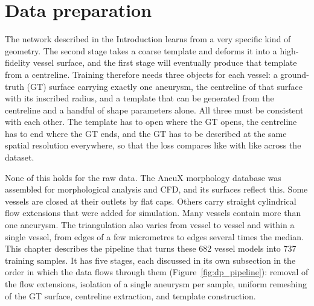 
\section{Data preparation}
\label{sec:dataprep}

The network described in the Introduction learns from a very specific kind of geometry. The second stage takes a coarse template and deforms it into a high-fidelity vessel surface, and the first stage will eventually produce that template from a centreline. Training therefore needs three objects for each vessel: a ground-truth (GT) surface carrying exactly one aneurysm, the centreline of that surface with its inscribed radius, and a template that can be generated from the centreline and a handful of shape parameters alone. All three must be consistent with each other. The template has to open where the GT opens, the centreline has to end where the GT ends, and the GT has to be described at the same spatial resolution everywhere, so that the loss compares like with like across the dataset.

None of this holds for the raw data. The AneuX morphology database \citep{juchler2022,juchler2022shape} was assembled for morphological analysis and CFD, and its surfaces reflect this. Some vessels are closed at their outlets by flat caps. Others carry straight cylindrical flow extensions that were added for simulation. Many vessels contain more than one aneurysm. The triangulation also varies from vessel to vessel and within a single vessel, from edges of a few micrometres to edges several times the median. This chapter describes the pipeline that turns these 682 vessel models into 737 training samples. It has five stages, each discussed in its own subsection in the order in which the data flows through them (Figure~\ref{fig:dp_pipeline}): removal of the flow extensions, isolation of a single aneurysm per sample, uniform remeshing of the GT surface, centreline extraction, and template construction.

